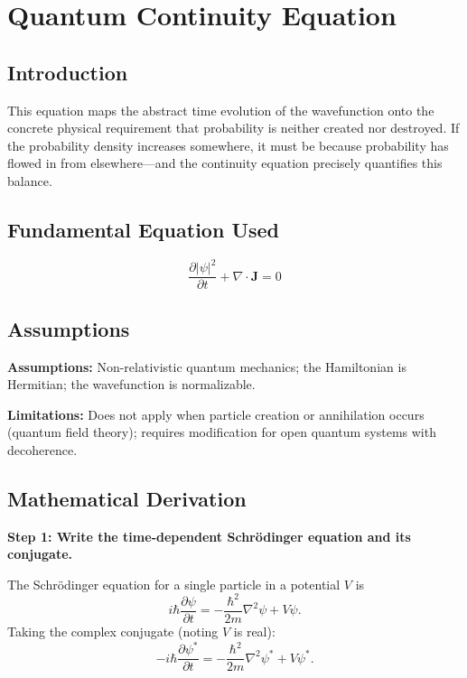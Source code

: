 \chapter{Quantum Continuity Equation}

\section*{Introduction}

This equation maps the abstract time evolution of the wavefunction onto the concrete physical requirement that probability is neither created nor destroyed. If the probability density increases somewhere, it must be because probability has flowed in from elsewhere---and the continuity equation precisely quantifies this balance.
\section*{Fundamental Equation Used}

\begin{equation}
\frac{\partial |\psi|^2}{\partial t} + \nabla \cdot \mathbf{J} = 0
\end{equation}
\section*{Assumptions}

\textbf{Assumptions:} Non-relativistic quantum mechanics; the Hamiltonian is Hermitian; the wavefunction is normalizable.


\textbf{Limitations:} Does not apply when particle creation or annihilation occurs (quantum field theory); requires modification for open quantum systems with decoherence.


\section*{Mathematical Derivation}

\textbf{Step 1: Write the time-dependent Schr\"{o}dinger equation and its conjugate.}

The Schr\"{o}dinger equation for a single particle in a potential $V$ is
\begin{equation}
i\hbar\frac{\partial\psi}{\partial t} = -\frac{\hbar^2}{2m}\nabla^2\psi + V\psi.
\end{equation}
Taking the complex conjugate (noting $V$ is real):
\begin{equation}
-i\hbar\frac{\partial\psi^*}{\partial t} = -\frac{\hbar^2}{2m}\nabla^2\psi^* + V\psi^*.
\end{equation}

